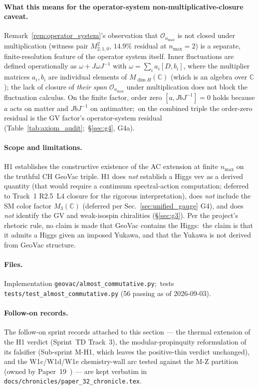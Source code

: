 \documentclass[11pt]{article}
\begin{document}
\paragraph{What this means for the operator-system non-multiplicative-closure
caveat.}  Remark~\ref{rem:operator_system}'s observation that
$\mathcal{O}_{n_{\max}}$ is not closed under multiplication
(witness pair $M_{2,1,0}^2$, $14.9\%$ residual at $n_{\max} = 2$)
is a separate, finite-resolution feature of the operator system
itself.  Inner fluctuations are defined operationally as $\omega +
J \omega J^{-1}$ with $\omega = \sum_i a_i [D, b_i]$, where the
multiplier matrices $a_i, b_i$ are individual elements of
$M_{\dim H}(\mathbb{C})$ (which is an algebra over $\mathbb{C}$);
the lack of closure of \emph{their span} $\mathcal{O}_{n_{\max}}$
under multiplication does not block the fluctuation calculus.
On the finite factor, order zero $[a, J b J^{-1}] = 0$ holds because
$a$ acts on matter and $J b J^{-1}$ on antimatter;\ on the combined
triple the order-zero residual is the GV factor's operator-system
residual (Table~\ref{tab:axiom_audit};\ \S\ref{sec:g4}, G4a).

\paragraph{Scope and limitations.}  H1 establishes the
constructive existence of the AC extension at finite $n_{\max}$
on the truthful CH GeoVac triple.  H1 does \emph{not} establish a
Higgs vev as a derived quantity (that would require a continuum
spectral-action computation; deferred to Track~1 R2.5~L4
closure for the rigorous interpretation), does \emph{not} include
the SM color factor $M_3(\mathbb{C})$ (deferred per
Sec.~\ref{sec:unified_gauge} G4), and does \emph{not} identify the
GV and weak-isospin chiralities (\S\ref{sec:g3}).  Per the project's
rhetoric rule, no claim is made that GeoVac contains the Higgs:\ the
claim is that it admits a Higgs given an imposed Yukawa, and that
the Yukawa is not derived from GeoVac structure.

\paragraph{Files.}  Implementation
\texttt{geovac/almost\_commutative.py};\ tests
\texttt{tests/test\_almost\_commutative.py} (56 passing as of
2026-09-03).

\paragraph{Follow-on records.}  The follow-on sprint records attached
to this section --- the thermal extension of the H1 verdict (Sprint~TD
Track~3), the modular-propinquity reformulation of its falsifier
(Sub-sprint M-H1, which leaves the positive-thin verdict unchanged), and
the W1c/W1d/W1e chemistry-wall arc tested against the M-Z partition
(owned by Paper~19~\cite{loutey_paper19}) --- are kept verbatim in
\texttt{docs/chronicles/paper\_32\_chronicle.tex}.
\end{document}
